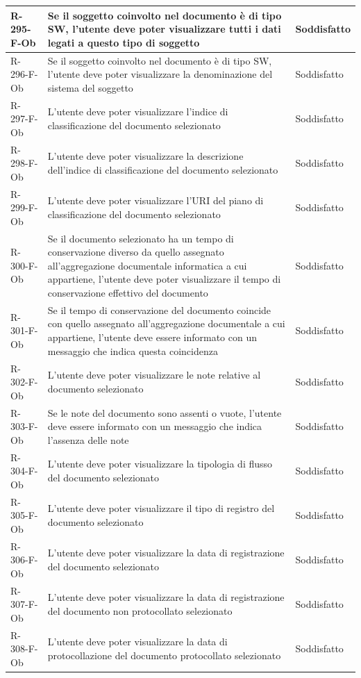 \begin{longtable}{|p{2.5cm}|p{9.5cm}|p{2.5cm}|}
\hline
R-295-F-Ob & Se il soggetto coinvolto nel documento è di tipo SW, l'utente deve poter visualizzare tutti i dati legati a questo tipo di soggetto & Soddisfatto \\
\hline
R-296-F-Ob & Se il soggetto coinvolto nel documento è di tipo SW, l'utente deve poter visualizzare la denominazione del sistema del soggetto & Soddisfatto \\
\hline
R-297-F-Ob & L'utente deve poter visualizzare l'indice di classificazione del documento selezionato & Soddisfatto \\
\hline
R-298-F-Ob & L'utente deve poter visualizzare la descrizione dell'indice di classificazione del documento selezionato & Soddisfatto \\
\hline
R-299-F-Ob & L'utente deve poter visualizzare l'URI del piano di classificazione del documento selezionato & Soddisfatto \\
\hline
R-300-F-Ob & Se il documento selezionato ha un tempo di conservazione diverso da quello assegnato all'aggregazione documentale informatica a cui appartiene, l'utente deve poter visualizzare il tempo di conservazione effettivo del documento & Soddisfatto \\
\hline
R-301-F-Ob & Se il tempo di conservazione del documento coincide con quello assegnato all'aggregazione documentale a cui appartiene, l'utente deve essere informato con un messaggio che indica questa coincidenza & Soddisfatto \\
\hline
R-302-F-Ob & L'utente deve poter visualizzare le note relative al documento selezionato & Soddisfatto \\
\hline
R-303-F-Ob & Se le note del documento sono assenti o vuote, l'utente deve essere informato con un messaggio che indica l'assenza delle note & Soddisfatto \\
\hline
R-304-F-Ob & L'utente deve poter visualizzare la tipologia di flusso del documento selezionato & Soddisfatto \\
\hline
R-305-F-Ob & L'utente deve poter visualizzare il tipo di registro del documento selezionato & Soddisfatto \\
\hline
R-306-F-Ob & L'utente deve poter visualizzare la data di registrazione del documento selezionato & Soddisfatto \\
\hline
R-307-F-Ob & L'utente deve poter visualizzare la data di registrazione del documento non protocollato selezionato & Soddisfatto \\
\hline
R-308-F-Ob & L'utente deve poter visualizzare la data di protocollazione del documento protocollato selezionato & Soddisfatto \\

\end{longtable}
